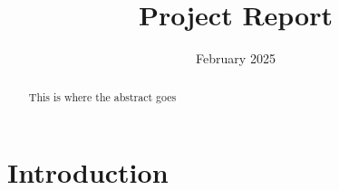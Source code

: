 \documentclass{article}
\title{Project Report}
\author{}
\date{February 2025}
\begin{document}
\maketitle

\begin{abstract}
    This is where the abstract goes
\end{abstract}

\section{Introduction}
\end{document}
